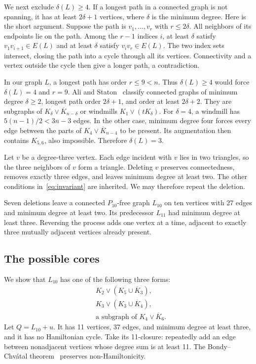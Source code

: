 \documentclass[12pt]{article}
\newcommand{\Ic}{\overline K}
\begin{document}
We next exclude $\delta(L)\geq4$. If a longest path in a
connected graph is not spanning, it has at least $2\delta+1$
vertices, where $\delta$ is the minimum degree. Here is the
short argument. Suppose the path is $v_1,\ldots,v_r$ with
$r\leq2\delta$. All neighbors of its endpoints lie on the
path. Among the $r-1$ indices $i$, at least $\delta$ satisfy
$v_1v_{i+1}\in E(L)$ and at least $\delta$ satisfy
$v_iv_r\in E(L)$. The two index sets intersect, closing the
path into a cycle through all its vertices. Connectivity and
a vertex outside the cycle then give a longer path, a
contradiction.

In our graph $L$, a longest path has order $r\leq9<n$.
Thus $\delta(L)\geq4$ would force $\delta(L)=4$ and $r=9$.
Ali and Staton~\cite[Theorem~3]{ali} classify connected graphs
of minimum degree $\delta\geq2$, longest path order
$2\delta+1$, and order at least $2\delta+2$.
They are subgraphs of $K_\delta\vee\Ic_{n-\delta}$ or
windmills $K_1\vee(tK_\delta)$.
For $\delta=4$, a windmill has $5(n-1)/2<3n-3$ edges.
In the other case, minimum degree four forces every edge
between the parts of $K_4\vee\Ic_{n-4}$ to be present.
Its augmentation then contains $K_{5,6}$, also impossible.
Therefore $\delta(L)=3$.

Let $v$ be a degree-three vertex. Each edge incident with $v$
lies in two triangles, so the three neighbors of $v$ form
a triangle. Deleting $v$ preserves connectedness, removes
exactly three edges, and leaves minimum degree at least two.
The other conditions in~\eqref{eq:invariant} are inherited.
We may therefore repeat the deletion.

Seven deletions leave a connected $P_{10}$-free graph $L_{10}$
on ten vertices with 27 edges and minimum degree at least two.
Its predecessor $L_{11}$ had minimum degree at least three.
Reversing the process adds one vertex at a time, adjacent to
exactly three mutually adjacent vertices already present.

\subsection{The possible cores}

We show that $L_{10}$ has one of the following three forms:
\begin{equation}\label{eq:cores}
 \begin{aligned}
 &K_2\vee(K_5\cup\Ic_3),\\
 &K_3\vee(K_3\cup\Ic_4),\\
 &\text{a subgraph of }K_4\vee\Ic_6.
 \end{aligned}
\end{equation}
Let $Q=L_{10}+u$. It has 11 vertices, 37 edges, and minimum
degree at least three, and it has no Hamiltonian cycle.
Take its 11-closure: repeatedly add an edge between nonadjacent
vertices whose degree sum is at least 11.
The Bondy--Chv\'atal theorem~\cite{closure} preserves
non-Hamiltonicity.
\end{document}
